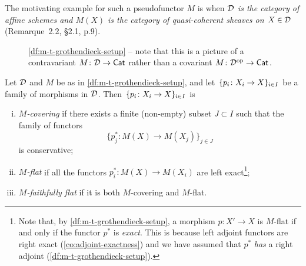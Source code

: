         The motivating example for such a pseudofunctor $M$ is when \emph{$\mathcal{D}$ is the category of affine schemes and \elide $M(X)$ is the category of quasi-coherent sheaves on $X\in\mathcal{D}$} (Remarque~2.2, \S2.1, p.9).

        \begin{figure}[h]
            \centering
            \caption{\cref{df:m-t-grothendieck-setup} – note that this is a picture of a contravariant $M\colon\mathcal{D}\to\mathsf{Cat}$ rather than a covariant $M\colon{\mathcal{D}}^{\mathrm{op}}\to\mathsf{Cat}$.}
            \label{fg:grothendieckpseudofunctor}
        \end{figure}

        \begin{definition}
            Let $\mathcal{D}$ and $M$ be as in \cref{df:m-t-grothendieck-setup}, and let $\{p_i\colon X_i\to X\}_{i\in I}$ be a family of morphisms in $\mathcal{D}$.
            Then $\{p_i\colon X_i\to X\}_{i\in I}$ is
            \begin{enumerate}[(i)]
                \item \emph{$M$-covering} if there exists a finite (non-empty) subset $J\subset I$ such that the family of functors
                \begin{equation*}
                    \{p_j^*\colon M(X)\to M(X_j)\}_{j\in J}
                \end{equation*}
                is conservative;
                \item \emph{$M$-flat} if all the functors $p_i^*\colon M(X)\to M(X_i)$ are left exact\footnote{
                    Note that, by \cref{df:m-t-grothendieck-setup}, a morphism $p\colon X'\to X$ is $M$-flat if and only if the functor $p^*$ is \emph{exact}.
                    This is because left adjoint functors are right exact (\cref{co:adjoint-exactness}) and we have assumed that $p^*$ \emph{has} a right adjoint (\cref{df:m-t-grothendieck-setup}).
                };
                \item \emph{$M$-faithfully flat} if it is both $M$-covering and $M$-flat.\qedhere
            \end{enumerate}
        \end{definition}

